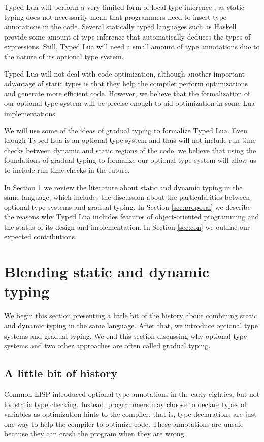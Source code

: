 \documentclass[preprint]{sig-alternate}
\begin{document}
Typed Lua will perform a very limited form of local type inference
\citep{pierce2000lti}, as static typing does not necessarily mean
that programmers need to insert type annotations in the code.
Several statically typed languages such as Haskell provide some
amount of type inference that automatically deduces the types of
expressions.
Still, Typed Lua will need a small amount of type annotations due
to the nature of its optional type system.

Typed Lua will not deal with code optimization, although another
important advantage of static types is that they help the compiler
perform optimizations and generate more efficient code.
However, we believe that the formalization of our optional type
system will be precise enough to aid optimization in some Lua
implementations.

We will use some of the ideas of gradual typing to formalize Typed Lua.
Even though Typed Lua is an optional type system and thus will not
include run-time checks between dynamic and static regions of the
code, we believe that using the foundations of gradual typing to
formalize our optional type system will allow us to include run-time
checks in the future.

In Section \ref{sec:review} we review the literature about static and
dynamic typing in the same language, which includes the discussion
about the particularities between optional type systems and gradual
typing.
In Section \ref{sec:proposal} we describe the reasons why Typed Lua
includes features of object-oriented programming and the status of
its design and implementation.
In Section \ref{sec:con} we outline our expected contributions.

\section{Blending static and dynamic typing} \label{sec:review}

We begin this section presenting a little bit of the history about
combining static and dynamic typing in the same language.
After that, we introduce optional type systems and gradual typing.
We end this section discussing why optional type systems and two
other approaches are often called gradual typing.

\subsection{A little bit of history}

Common LISP \citep{steele1982ocl} introduced optional type annotations
in the early eighties, but not for static type checking.
Instead, programmers may choose to declare types of variables as
optimization hints to the compiler, that is, type declarations are
just one way to help the compiler to optimize code.
These annotations are unsafe because they can crash the program
when they are wrong.
\end{document}
